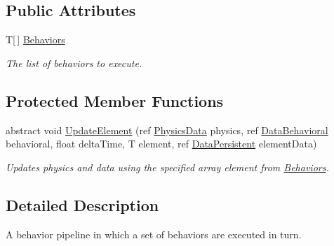 \subsection*{Public Attributes}
\begin{DoxyCompactItemize}
\item 
T\mbox{[}$\,$\mbox{]} \hyperlink{class_skyrates_1_1_a_i_1_1_composite_1_1_behavior_pipeline_3_01_t_01_4_a2aab9838c797aba8c79d66325e6e2874}{Behaviors}
\begin{DoxyCompactList}\small\item\em The list of behaviors to execute. \end{DoxyCompactList}\end{DoxyCompactItemize}
\subsection*{Protected Member Functions}
\begin{DoxyCompactItemize}
\item 
abstract void \hyperlink{class_skyrates_1_1_a_i_1_1_composite_1_1_behavior_pipeline_3_01_t_01_4_ac6e65c6979be20a72eb991bd81722ec3}{Update\-Element} (ref \hyperlink{class_skyrates_1_1_physics_1_1_physics_data}{Physics\-Data} physics, ref \hyperlink{class_skyrates_1_1_a_i_1_1_behavior_1_1_data_behavioral}{Data\-Behavioral} behavioral, float delta\-Time, T element, ref \hyperlink{class_skyrates_1_1_a_i_1_1_behavior_1_1_data_persistent}{Data\-Persistent} element\-Data)
\begin{DoxyCompactList}\small\item\em Updates physics and data using the specified array element from \hyperlink{class_skyrates_1_1_a_i_1_1_composite_1_1_behavior_pipeline_3_01_t_01_4_a2aab9838c797aba8c79d66325e6e2874}{Behaviors}. \end{DoxyCompactList}\end{DoxyCompactItemize}


\subsection{Detailed Description}
A behavior pipeline in which a set of behaviors are executed in turn. 



